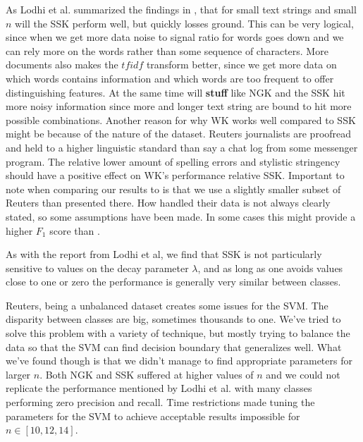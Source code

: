 
As Lodhi et al. summarized the findings in \cite{lodhi}, that for small text strings and small $ n $ will the SSK perform well, but quickly losses ground. This can be very logical, since when we get more data noise to signal ratio for words goes down and we can rely more on the words rather than some sequence of characters. More documents also makes the $ tfidf $ transform better, since we get more data on which words contains information and which words are too frequent to offer distinguishing features. At the same time will \textbf{stuff} like NGK and the SSK hit more noisy information since more and longer text string are bound to hit more possible combinations. Another reason for why WK works well compared to SSK might be because of the nature of the dataset. Reuters journalists are proofread and held to a higher linguistic standard than say a chat log from some messenger program. The relative lower amount of spelling errors and stylistic stringency should have a positive effect on WK's performance relative SSK. Important to note when comparing our results to \cite{lodhi} is that we use a slightly smaller subset of Reuters than presented there. How \cite{lodhi} handled their data is not always clearly stated, so some assumptions have been made. In some cases this might provide a higher $ F_1 $ score than \cite{lodh}.

As with the report from Lodhi et al, we find that SSK is not particularly sensitive to values on the decay parameter $ \lambda $, and as long as one avoids values close to one or zero the performance is generally very similar between classes.

Reuters, being a unbalanced dataset creates some issues for the SVM. The disparity between classes are big, sometimes thousands to one. We've tried to solve this problem with a variety of technique, but mostly trying to balance the data so that the SVM can find decision boundary that generalizes well. What we've found though is that we didn't manage to find appropriate parameters for larger $ n $. Both NGK and SSK suffered at higher values of $ n $ and we could not replicate the performance mentioned by Lodhi et al. with many classes performing zero precision and recall. Time restrictions made tuning the parameters for the SVM to achieve acceptable results impossible for $ n \in [10,12,14] $. 


